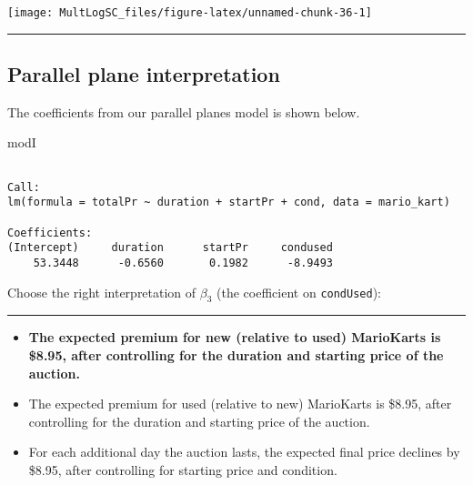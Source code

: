 \documentclass[]{book}
\newenvironment{Shaded}{\begin{snugshade}}{\end{snugshade}}
\newcommand{\NormalTok}[1]{#1}
\begin{document}
\begin{center}\texttt{[image: MultLogSC\_files/figure-latex/unnamed-chunk-36-1]} \end{center}

\begin{center}\rule{0.5\linewidth}{\linethickness}\end{center}

\subsection*{Parallel plane
interpretation}\label{parallel-plane-interpretation}

The coefficients from our parallel planes model is shown below.

\begin{Shaded}
\begin{Highlighting}[]
\NormalTok{modI}
\end{Highlighting}
\end{Shaded}

\begin{verbatim}

Call:
lm(formula = totalPr ~ duration + startPr + cond, data = mario_kart)

Coefficients:
(Intercept)     duration      startPr     condused  
    53.3448      -0.6560       0.1982      -8.9493  
\end{verbatim}

Choose the right interpretation of \(\beta_3\) (the coefficient on
\texttt{condUsed}):

\begin{center}\rule{0.5\linewidth}{\linethickness}\end{center}

\begin{itemize}
\item
  \textbf{The expected premium for new (relative to used) MarioKarts is
  \$8.95, after controlling for the duration and starting price of the
  auction.}
\item
  The expected premium for used (relative to new) MarioKarts is \$8.95,
  after controlling for the duration and starting price of the auction.
\item
  For each additional day the auction lasts, the expected final price
  declines by \$8.95, after controlling for starting price and
  condition.
\end{itemize}
\end{document}
